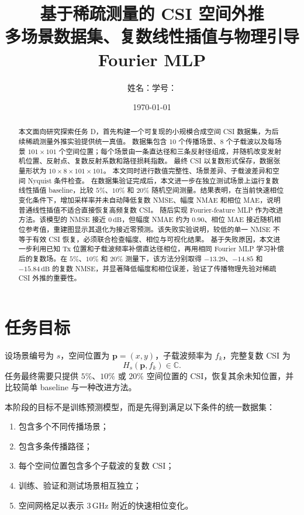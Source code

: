 \documentclass[UTF8,a4paper,11pt]{ctexart}
\title{基于稀疏测量的 CSI 空间外推\\
\large 多场景数据集、复数线性插值与物理引导 Fourier MLP}
\author{姓名：\underline{\hspace{4cm}}\qquad 学号：\underline{\hspace{4cm}}}
\date{\today}
\begin{document}
\maketitle

\begin{abstract}
本文面向研究探索任务 D，首先构建一个可复现的小规模合成空间 CSI 数据集，为后续稀疏测量外推实验提供统一真值。
数据集包含 10 个传播场景、8 个子载波以及每场景 $101\times101$ 个空间位置；每个场景由一条直达径和三条反射径组成，并随机改变发射机位置、反射点、复数反射系数和路径损耗指数。
最终 CSI 以复数形式保存，数据张量形状为 $10\times8\times101\times101$。
本文同时进行数值完整性、场景差异、子载波差异和空间 Nyquist 条件检查。
在数据集验证完成后，本文进一步在独立测试场景上运行复数线性插值 baseline，比较 $5\%$、$10\%$ 和 $20\%$ 随机空间测量。结果表明，在当前快速相位变化条件下，增加采样率并未自动降低复数 NMSE、幅度 NMAE 和相位 MAE，说明普通线性插值不适合直接恢复高频复数 CSI。
随后实现 Fourier-feature MLP 作为改进方法。该模型的 NMSE 接近 $0\,\mathrm{dB}$，但幅度 NMAE 约为 $0.90$、相位 MAE 接近随机相位参考值，重建图显示其退化为接近零预测。该失败实验说明，较低的单一 NMSE 不等于有效 CSI 恢复，必须联合检查幅度、相位与可视化结果。
基于失败原因，本文进一步利用已知 Tx 位置和子载波频率补偿直达径相位，再用相同 Fourier MLP 学习补偿后的复数场。在 $5\%$、$10\%$ 和 $20\%$ 测量下，该方法分别取得 $-13.29$、$-14.85$ 和 $-15.84\,\mathrm{dB}$ 的复数 NMSE，并显著降低幅度和相位误差，验证了传播物理先验对稀疏 CSI 外推的重要性。
\end{abstract}

\section{任务目标}

设场景编号为 $s$，空间位置为 $\mathbf p=(x,y)$，子载波频率为 $f_k$，完整复数 CSI 为
\begin{equation}
    H_s(\mathbf p,f_k)\in\mathbb C.
\end{equation}
任务最终需要只提供 $5\%$、$10\%$ 或 $20\%$ 空间位置的 CSI，恢复其余未知位置，并比较简单 baseline 与一种改进方法。

本阶段的目标不是训练预测模型，而是先得到满足以下条件的统一数据集：
\begin{enumerate}[label=(\arabic*)]
    \item 包含多个不同传播场景；
    \item 包含多条传播路径；
    \item 每个空间位置包含多个子载波的复数 CSI；
    \item 训练、验证和测试场景相互独立；
    \item 空间网格足以表示 $3\,\mathrm{GHz}$ 附近的快速相位变化。
\end{enumerate}
\end{document}
